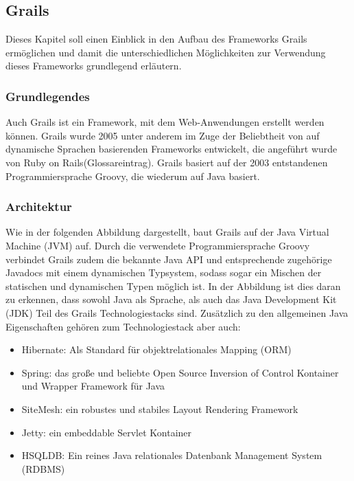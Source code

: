 \subsection{Grails}
Dieses Kapitel soll einen Einblick in den Aufbau des Frameworks Grails ermöglichen und damit die unterschiedlichen Möglichkeiten zur Verwendung dieses Frameworks grundlegend erläutern.

\subsubsection{Grundlegendes}
Auch Grails ist ein Framework, mit dem Web-Anwendungen erstellt werden können. Grails wurde 2005 unter anderem im Zuge der Beliebtheit von auf dynamische Sprachen basierenden Frameworks entwickelt, die angeführt wurde von Ruby on Rails(Glossareintrag). Grails basiert auf der 2003 entstandenen Programmiersprache Groovy, die wiederum auf Java basiert. 

\subsubsection{Architektur}
Wie in der folgenden Abbildung dargestellt, baut Grails auf der Java Virtual Machine (JVM) auf. Durch die verwendete Programmiersprache Groovy verbindet Grails zudem die bekannte Java API und entsprechende zugehörige Javadocs mit einem dynamischen Typsystem, sodass sogar ein Mischen der statischen und dynamischen Typen möglich ist. In der Abbildung ist dies daran zu erkennen, dass sowohl Java als Sprache, als auch das Java Development Kit (JDK) Teil des Grails Technologiestacks sind. Zusätzlich zu den allgemeinen Java Eigenschaften gehören zum Technologiestack aber auch:
\begin{itemize}
\item Hibernate: Als Standard für objektrelationales Mapping (ORM)
\item Spring: das große und beliebte Open Source Inversion of Control Kontainer und Wrapper Framework für Java
\item SiteMesh: ein robustes und stabiles Layout Rendering Framework
\item Jetty: ein embeddable Servlet Kontainer
\item HSQLDB: Ein reines Java relationales Datenbank Management System (RDBMS) 
\end{itemize}
 
